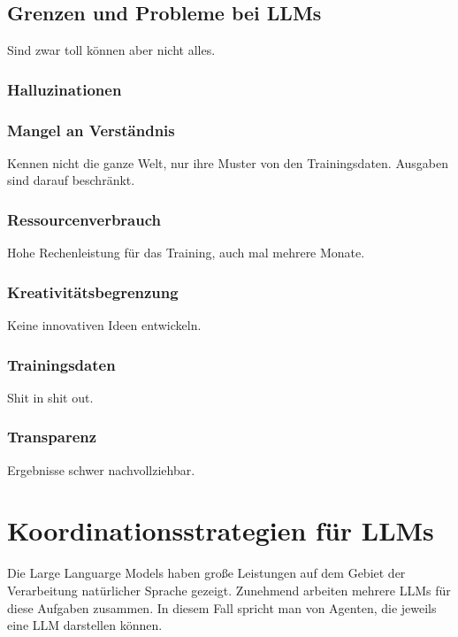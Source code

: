 \subsection{Grenzen und Probleme bei LLMs}
Sind zwar toll können aber nicht alles.

\subsubsection{Halluzinationen}


\subsubsection{Mangel an Verständnis}
Kennen nicht die ganze Welt, nur ihre Muster von den Trainingsdaten. Ausgaben sind darauf beschränkt.


\subsubsection{Ressourcenverbrauch}
Hohe Rechenleistung für das Training, auch mal mehrere Monate.


\subsubsection{Kreativitätsbegrenzung}
Keine innovativen Ideen entwickeln.


\subsubsection{Trainingsdaten}
Shit in shit out.


\subsubsection{Transparenz}
Ergebnisse schwer nachvollziehbar.


\section{Koordinationsstrategien für LLMs}
Die Large Languarge Models haben große Leistungen auf dem Gebiet der Verarbeitung natürlicher Sprache gezeigt. Zunehmend arbeiten mehrere LLMs für diese Aufgaben zusammen. In diesem Fall spricht man von Agenten, die jeweils eine LLM darstellen können.\vspace{0.2cm}

